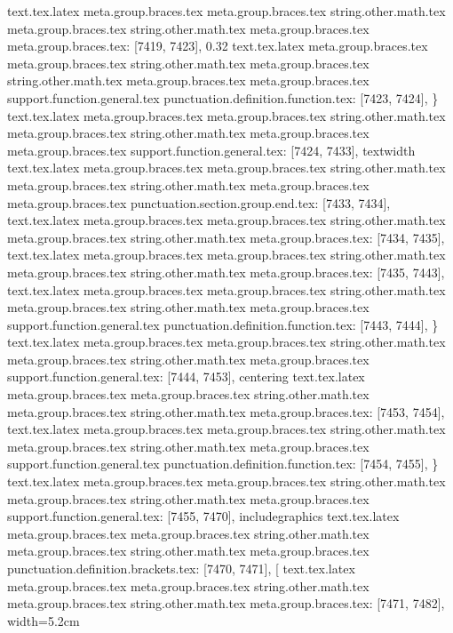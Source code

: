 {{{{{{{{{{{{{{{{{{{{{{{{{{{{{{{{{{{{{{{{{{{{{{{{{{{{{{{{{{{{{{{{{{{{{{{{{{{{{{{{{{{{{{{{{{{{{{{{{{{{{{{{{{{{{{{{{{{{{{{{{{{{{{{{{{{{{{{{{{{{{{{{{{{{{{{{{{{{{{{{{{{{{{{{{{{{{{{{{{{{{{{{{{{{{{{{{{{{{{{{{{text.tex.latex meta.group.braces.tex meta.group.braces.tex string.other.math.tex meta.group.braces.tex string.other.math.tex meta.group.braces.tex meta.group.braces.tex: [7419, 7423], {0.32}
text.tex.latex meta.group.braces.tex meta.group.braces.tex string.other.math.tex meta.group.braces.tex string.other.math.tex meta.group.braces.tex meta.group.braces.tex support.function.general.tex punctuation.definition.function.tex: [7423, 7424], {\}
text.tex.latex meta.group.braces.tex meta.group.braces.tex string.other.math.tex meta.group.braces.tex string.other.math.tex meta.group.braces.tex meta.group.braces.tex support.function.general.tex: [7424, 7433], {textwidth}
text.tex.latex meta.group.braces.tex meta.group.braces.tex string.other.math.tex meta.group.braces.tex string.other.math.tex meta.group.braces.tex meta.group.braces.tex punctuation.section.group.end.tex: [7433, 7434], {}}
text.tex.latex meta.group.braces.tex meta.group.braces.tex string.other.math.tex meta.group.braces.tex string.other.math.tex meta.group.braces.tex: [7434, 7435], {
}
text.tex.latex meta.group.braces.tex meta.group.braces.tex string.other.math.tex meta.group.braces.tex string.other.math.tex meta.group.braces.tex: [7435, 7443], {        }
text.tex.latex meta.group.braces.tex meta.group.braces.tex string.other.math.tex meta.group.braces.tex string.other.math.tex meta.group.braces.tex support.function.general.tex punctuation.definition.function.tex: [7443, 7444], {\}
text.tex.latex meta.group.braces.tex meta.group.braces.tex string.other.math.tex meta.group.braces.tex string.other.math.tex meta.group.braces.tex support.function.general.tex: [7444, 7453], {centering}
text.tex.latex meta.group.braces.tex meta.group.braces.tex string.other.math.tex meta.group.braces.tex string.other.math.tex meta.group.braces.tex: [7453, 7454], { }
text.tex.latex meta.group.braces.tex meta.group.braces.tex string.other.math.tex meta.group.braces.tex string.other.math.tex meta.group.braces.tex support.function.general.tex punctuation.definition.function.tex: [7454, 7455], {\}
text.tex.latex meta.group.braces.tex meta.group.braces.tex string.other.math.tex meta.group.braces.tex string.other.math.tex meta.group.braces.tex support.function.general.tex: [7455, 7470], {includegraphics}
text.tex.latex meta.group.braces.tex meta.group.braces.tex string.other.math.tex meta.group.braces.tex string.other.math.tex meta.group.braces.tex punctuation.definition.brackets.tex: [7470, 7471], {[}
text.tex.latex meta.group.braces.tex meta.group.braces.tex string.other.math.tex meta.group.braces.tex string.other.math.tex meta.group.braces.tex: [7471, 7482], {width=5.2cm}
}}}}}}}}}}}}}}}}}}}}}}}}}}}}}}}}}}}}}}}}}}}}}}}}}}}}}}}}}}}}}}}}}}}}}}}}}}}}}}}}}}}}}}}}}}}}}}}}}}}}}}}}}}}}}}}}}}}}}}}}}}}}}}}}}}}}}}}}}}}}}}}}}}}}}}}}}}}}}}}}}}}}}}}}}}}}}}}}}}}}}}}}}}}}}}}}}}}}}}}}}}}}
